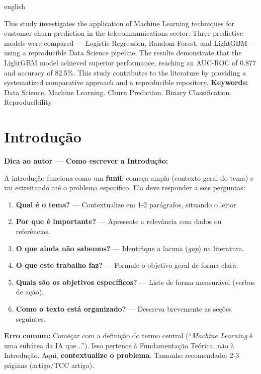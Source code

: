 \documentclass[
    article,
    12pt,
    oneside,
    a4paper,
    english,
    brazilian
    ]{abntex2}
\numberwithin{equation}{section}
\newenvironment{dica}{%
    \par\medskip
    \color{blue!60!black}\small\itshape
}{%
    \par\medskip
}
\begin{document}
\begin{otherlanguage*}{english}
\begin{resumo}[Abstract]
\noindent This study investigates the application of Machine Learning techniques for customer churn prediction in the telecommunications sector. Three predictive models were compared --- Logistic Regression, Random Forest, and LightGBM --- using a reproducible Data Science pipeline. The results demonstrate that the LightGBM model achieved superior performance, reaching an AUC-ROC of 0.877 and accuracy of 82.5\%. This study contributes to the literature by providing a systematized comparative approach and a reproducible repository.
\newline
\noindent \textbf{Keywords:} Data Science. Machine Learning. Churn Prediction. Binary Classification. Reproducibility.
\end{resumo}
\end{otherlanguage*}
\newpage

\textual

\section{Introdução}

\begin{dica}
\noindent\textbf{Dica ao autor — Como escrever a Introdução:}

A introdução funciona como um \textbf{funil}: começa ampla (contexto geral do tema) e vai estreitando até o problema específico. Ela deve responder a seis perguntas:
\begin{enumerate}
    \item \textbf{Qual é o tema?} — Contextualize em 1-2 parágrafos, situando o leitor.
    \item \textbf{Por que é importante?} — Apresente a relevância com dados ou referências.
    \item \textbf{O que ainda não sabemos?} — Identifique a lacuna (\textit{gap}) na literatura.
    \item \textbf{O que este trabalho faz?} — Formule o objetivo geral de forma clara.
    \item \textbf{Quais são os objetivos específicos?} — Liste de forma mensurável (verbos de ação).
    \item \textbf{Como o texto está organizado?} — Descreva brevemente as seções seguintes.
\end{enumerate}
\textbf{Erro comum:} Começar com a definição do termo central (``\textit{Machine Learning} é uma subárea da IA que...''). Isso pertence à Fundamentação Teórica, não à Introdução. Aqui, \textbf{contextualize o problema}. Tamanho recomendado: 2-3 páginas (artigo/TCC artigo).
\end{dica}
\end{document}

